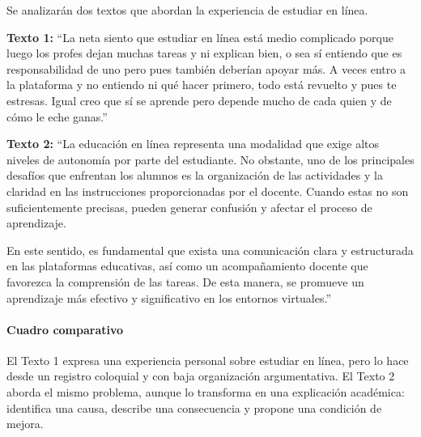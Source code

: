 Se analizarán dos textos que abordan la experiencia de estudiar en línea.

\textbf{Texto 1:} ``La neta siento que estudiar en línea está medio complicado porque luego los profes dejan muchas tareas y ni explican bien, o sea sí entiendo que es responsabilidad de uno pero pues también deberían apoyar más. A veces entro a la plataforma y no entiendo ni qué hacer primero, todo está revuelto y pues te estresas. Igual creo que sí se aprende pero depende mucho de cada quien y de cómo le eche ganas.''

\textbf{Texto 2:} ``La educación en línea representa una modalidad que exige altos niveles de autonomía por parte del estudiante. No obstante, uno de los principales desafíos que enfrentan los alumnos es la organización de las actividades y la claridad en las instrucciones proporcionadas por el docente. Cuando estas no son suficientemente precisas, pueden generar confusión y afectar el proceso de aprendizaje.

En este sentido, es fundamental que exista una comunicación clara y estructurada en las plataformas educativas, así como un acompañamiento docente que favorezca la comprensión de las tareas. De esta manera, se promueve un aprendizaje más efectivo y significativo en los entornos virtuales.''

\paragraph{Cuadro comparativo}

El Texto 1 expresa una experiencia personal sobre estudiar en línea, pero lo hace desde un registro coloquial y con baja organización argumentativa. El Texto 2 aborda el mismo problema, aunque lo transforma en una explicación académica: identifica una causa, describe una consecuencia y propone una condición de mejora.

